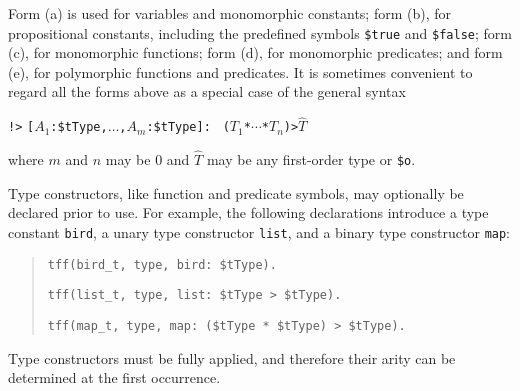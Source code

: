 Form (a) is used for variables and monomorphic constants; form (b), for
propositional constants, including the predefined symbols \verb+$true+ and
\verb+$false+; form (c), for monomorphic functions; form (d), for monomorphic
predicates; and form (e), for polymorphic functions and predicates.
It is sometimes convenient to regard all the forms above as a special case of
the general syntax
\begin{center}
{\tt !>} {\tt [$A_1$\;:\;\$tType,\;${\dots}$,\;$A_m$\;:\;\$tType]:} {\tt
($T_1$\;*\;${\cdots}$\;*\;$T_n$)\;>\;$\widehat T$}
\end{center}
where $m$ and $n$ may be 0 and $\widehat T$ may be any first-order type or
{\tt \$o}.



 Type constructors,
like function and predicate symbols,
may optionally be declared prior to use.
For example, the following declarations introduce a type
constant {\tt bird}, a unary type constructor {\tt list},
and a binary type constructor {\tt map}:
\begin{quote}
\verb+tff(bird_t, type, bird: $tType).+
\par\smallskip
\verb+tff(list_t, type, list: $tType > $tType).+
\par\smallskip
\verb+tff(map_t, type, map: ($tType * $tType) > $tType).+
\end{quote}
Type constructors must be fully applied, and therefore
their arity can be %
determined at the first occurrence.

